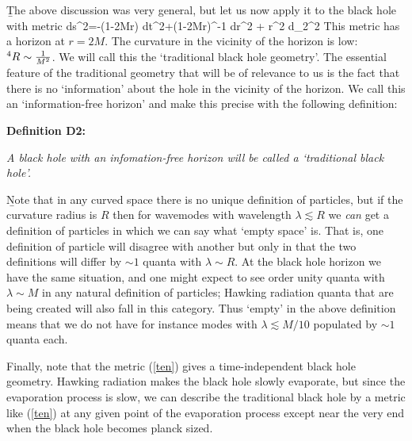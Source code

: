 \documentclass[12pt]{article}
\begin{document}
\b



The above discussion was very general, but let us now apply it to the black hole with metric
\be
ds^2=-(1-{2M\over r}) dt^2+(1-{2M\over r})^{-1} dr^2 + r^2 d\Omega_2^2
\label{ten}
\ee
This metric has a horizon at $r=2M$. The curvature in the vicinity of the horizon is low: ${}^4R\sim {1\over M^2}$. We will call this the `traditional black hole geometry'. The essential feature of the traditional geometry that will be of relevance to us is the fact that  there is no `information' about the hole in the vicinity of the horizon. We call this an `information-free horizon' and make this precise with the following definition:

\b

{\bf Definition D2:} 

\b

{\it A black hole with an infomation-free horizon will be called a `traditional black hole'.}

\b

 Note that in any curved space there is no unique definition of particles, but if the curvature radius is $R$ then for wavemodes with wavelength $\lambda \lesssim R$ we {\it can} get a definition of particles in which we can say what `empty space' is. That is, one definition of particle will disagree with another but only in that the two definitions will differ by $\sim 1$  quanta with $\lambda \sim R$.  At the black hole horizon we have the same situation, and one might expect to see order unity quanta with $\lambda\sim M$ in any natural definition of particles; Hawking radiation quanta that are being created will also fall in this category.  Thus `empty' in the above definition means that we do not have for instance modes with $\lambda \lesssim M/10$ populated by $\sim 1$ quanta each.
 
 Finally, note that the metric (\ref{ten}) gives a time-independent black hole geometry. Hawking radiation makes the black hole slowly evaporate, but since the evaporation process is slow, we can describe the traditional black hole by a  metric like (\ref{ten}) at any given point of the evaporation process except near the very end when the black hole becomes planck sized.
 
\end{document}
